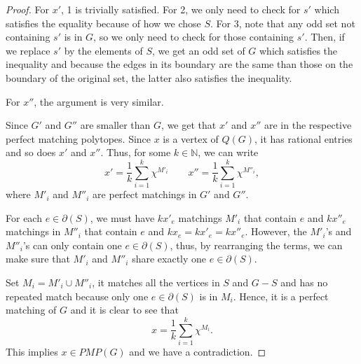 \documentclass{tufte-handout}
\theoremstyle{definition}
\theoremstyle{remark}
\newcommand{\N}{\mathbb{N}}
\begin{document}
\begin{proof}
	For $x'$, 1 is trivially satisfied. For 2, we only need to check for $s'$ which satisfies the equality because of how we chose $S$. For 3, note that any odd set not containing $s'$ is in $G$, so we only need to check for those containing $s'$. Then, if we replace $s'$ by the elements of $S$, we get an odd set of $G$ which satisfies the inequality and because the edges in its boundary are the same than those on the boundary of the original set, the latter also satisfies the inequality.
	
	For $x''$, the argument is very similar.
	
	Since $G'$ and $G''$ are smaller than $G$, we get that $x'$ and $x''$ are in the respective perfect matching polytopes. Since $x$ is a vertex of $Q(G)$, it has rational entries and so does $x'$ and $x''$. Thus, for some $k \in \N$, we can write 
	$$x' = \frac{1}{k}\sum_{i=1}^k\chi^{M'_i} \quad \quad x'' = \frac{1}{k}\sum_{i=1}^k\chi^{M''_i},$$
	where $M'_i$ and $M''_i$ are perfect matchings in $G'$ and $G''$.
	
	For each $e \in \partial(S)$, we must have $kx'_e$ matchings $M'_i$ that contain $e$ and $kx''_e$  matchings in $M''_i$ that contain $e$ and $kx_e = kx'_e = kx''_e$. However, the $M'_i$'s and $M''_i$'s can only contain one $e \in \partial(S)$, thus, by rearranging the terms, we can make sure that $M'_i$ and $M''_i$ share exactly one $e \in \partial(S)$.
	
	Set $M_i = M'_i \cup M''_i$, it matches all the vertices in $S$ and $G-S$ and has no repeated match because only one $e \in \partial(S)$ is in $M_i$. Hence, it is a perfect matching of $G$ and it is clear to see that 
	$$x = \frac{1}{k} \sum_{i=1}^k\chi^{M_i}.$$
	This implies $x \in PMP(G)$ and we have a contradiction.
	
\end{proof}
\end{document}
